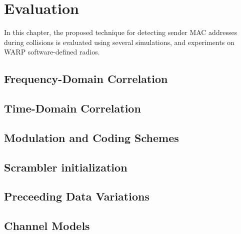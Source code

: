 
\chapter{Evaluation}\label{ch:evaluation}
\glsresetall %

In this chapter, the proposed technique for detecting sender MAC addresses during collisions is evaluated using several simulations, and experiments on WARP software-defined radios.



\section{Frequency-Domain Correlation}



\section{Time-Domain Correlation}



\section{Modulation and Coding Schemes}



\section{Scrambler initialization}



\section{Preceeding Data Variations}



\section{Channel Models}



